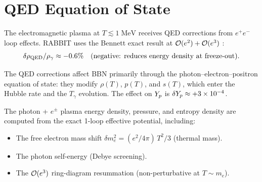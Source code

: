 \section{QED Equation of State}\label{sec:qed}

The electromagnetic plasma at $T \lesssim 1\;\mathrm{MeV}$ receives QED corrections from $e^+e^-$ loop effects.  RABBIT uses the Bennett exact result at $\mathcal{O}(e^2) + \mathcal{O}(e^3)$ \cite{Bennett2020}:
\begin{equation}
\delta\rho_{\rm QED}/\rho_\gamma \approx -0.6\%\quad\text{(negative: reduces energy density at freeze-out).}
\end{equation}

The QED corrections affect BBN primarily through the photon--electron--positron equation of state: they modify $\rho(T)$, $p(T)$, and $s(T)$, which enter the Hubble rate and the $T_\gamma$ evolution.  The effect on $Y_p$ is $\delta Y_p \approx +3 \times 10^{-4}$.

The photon + $e^\pm$ plasma energy density, pressure, and entropy density are computed from the exact 1-loop effective potential, including:
\begin{itemize}
\item The free electron mass shift $\delta m_e^2 = (e^2/4\pi)\,T^2/3$ (thermal mass).
\item The photon self-energy (Debye screening).
\item The $\mathcal{O}(e^3)$ ring-diagram resummation (non-perturbative at $T \sim m_e$).
\end{itemize}

